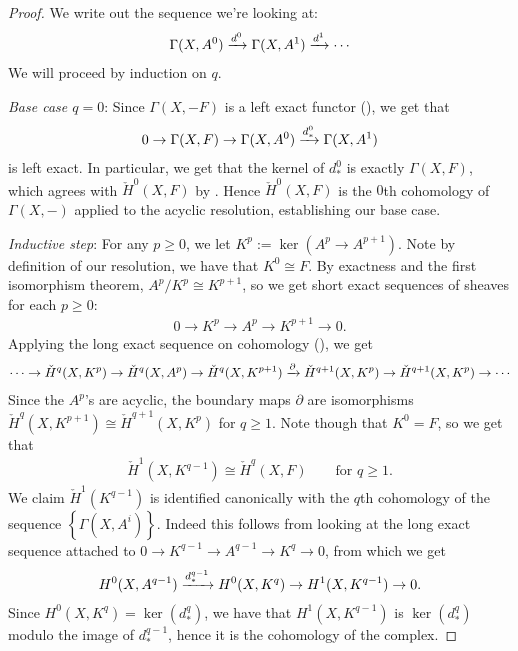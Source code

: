 \documentclass[11pt]{book}
\begin{document}
\begin{proof} We write out the sequence we're looking at:
\begin{align*}
    \Gamma(X,A^0) \xrightarrow{d^0} \Gamma(X,A^1) \xrightarrow{d^1} \cdots
\end{align*}
We will proceed by induction on $q$. 

\emph{Base case $q=0$}: Since $\Gamma(X,-F)$ is a left exact functor (), we get that
\begin{align*}
    0 \to \Gamma(X,F) \to \Gamma(X,A^0) \xrightarrow{d^0_\ast} \Gamma(X,A^1)
\end{align*}
is left exact. In particular, we get that the kernel of $d^0_\ast$ is exactly $\Gamma(X,F)$, which agrees with $\check{H}^0(X,F)$ by . Hence $\check{H}^0(X,F)$ is the $0$th cohomology of $\Gamma(X,-)$ applied to the acyclic resolution, establishing our base case.

\emph{Inductive step}: For any $p\ge0$, we let $K^p := \ker(A^p \to A^{p+1})$. Note by definition of our resolution, we have that $K^0\cong F$. By exactness and the first isomorphism theorem, $A^p/K^p \cong K^{p+1}$, so we get short exact sequences of sheaves for each $p\ge 0$:
\begin{align*}
    0 \to K^p \to A^p \to K^{p+1}\to 0.
\end{align*}
Applying the long exact sequence on cohomology (), we get
\begin{align*}
    \cdots \to \check{H}^q(X,K^p) \to \check{H}^q(X,A^p) \to \check{H}^q(X,K^{p+1})\xrightarrow{\partial} \check{H}^{q+1}(X,K^p) \to \check{H}^{q+1}(X,K^p) \to \cdots
\end{align*}
Since the $A^p$'s are acyclic, the boundary maps $\partial$ are isomorphisms $\check{H}^q(X,K^{p+1})\cong \check{H}^{q+1}(X,K^p)$ for $q\ge 1$. Note though that $K^0 = F$, so we get that
\begin{align*}
    \check{H}^1(X,K^{q-1}) \cong \check{H}^q(X,F) \quad\quad \text{for }q\ge1.
\end{align*}
We claim $\check{H}^1(K^{q-1})$ is identified canonically with the $q$th cohomology of the sequence $\left\{ \Gamma(X,A^i) \right\}$. Indeed this follows from looking at the long exact sequence attached to $0 \to K^{q-1} \to A^{q-1}\to K^q \to 0$, from which we get
\begin{align*}
    H^0(X,A^{q-1}) \xrightarrow{d^{q-1}_\ast} H^0(X,K^q) \to H^1(X,K^{q-1}) \to 0.
\end{align*}
Since $H^0(X,K^q) = \ker(d^q_\ast)$, we have that $H^1(X,K^{q-1})$ is $\ker(d^q_\ast)$ modulo the image of $d^{q-1}_\ast$, hence it is the cohomology of the complex.
\end{proof}
\end{document}

